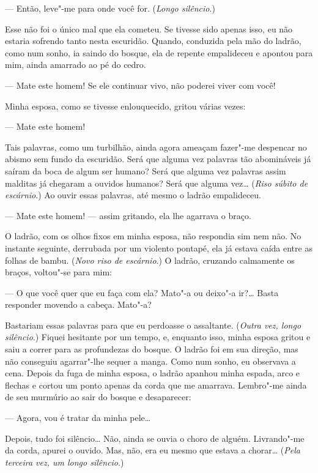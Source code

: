 --- Então, leve"-me para onde você for. (\textit{Longo silêncio}.)

Esse não foi o único mal que ela cometeu. Se tivesse sido apenas isso,
eu não estaria sofrendo tanto nesta escuridão. Quando, conduzida pela
mão do ladrão, como num sonho, ia saindo do bosque, ela de repente
empalideceu e apontou para mim, ainda amarrado ao pé do cedro.

--- Mate este homem! Se ele continuar vivo, não poderei viver com você!

Minha esposa, como se tivesse enlouquecido, gritou várias vezes:

--- Mate este homem!

Tais palavras, como um turbilhão, ainda agora ameaçam fazer"-me despencar
no abismo sem fundo da escuridão. Será que alguma vez palavras tão
abomináveis já saíram da boca de algum ser humano? Será que alguma vez
palavras assim malditas já chegaram a ouvidos humanos? Será que alguma
vez\ldots{} (\textit{Riso súbito de escárnio}.) Ao ouvir essas palavras, até mesmo o
ladrão empalideceu.

--- Mate este homem! --- assim gritando, ela lhe agarrava o braço.

O ladrão, com os olhos fixos em minha esposa, não respondia sim nem não.
No instante seguinte, derrubada por um violento pontapé, ela já estava
caída entre as folhas de bambu. (\textit{Novo riso de escárnio}.) O ladrão,
cruzando calmamente os braços, voltou"-se para mim:

--- O que você quer que eu faça com ela? Mato"-a ou deixo"-a ir?\ldots{} Basta
responder movendo a cabeça. Mato"-a?

Bastariam essas palavras para que eu perdoasse o assaltante. (\textit{Outra vez,
longo silêncio}.) Fiquei hesitante por um tempo, e, enquanto isso, minha
esposa gritou e saiu a correr para as profundezas do bosque. O ladrão
foi em sua direção, mas não conseguiu agarrar"-lhe sequer a manga. Como
num sonho, eu observava a cena. Depois da fuga de minha esposa, o
ladrão apanhou minha espada, arco e flechas e cortou um ponto apenas da
corda que me amarrava. Lembro"-me ainda de seu murmúrio ao sair do
bosque e desaparecer:

--- Agora, vou é tratar da minha pele\ldots{}

Depois, tudo foi silêncio\ldots{} Não, ainda se ouvia o choro de alguém.
Livrando"-me da corda, apurei o ouvido. Mas, não, era eu mesmo que
estava a chorar\ldots{} (\textit{Pela terceira vez, um longo silêncio}.)

